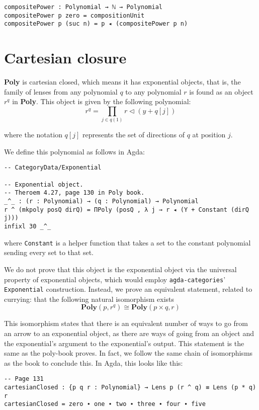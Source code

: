 \begin{verbatim}
compositePower : Polynomial → ℕ → Polynomial
compositePower p zero = compositionUnit
compositePower p (suc n) = p ◂ (compositePower p n) 
\end{verbatim}

\section{Cartesian closure}
\label{sec:cartesian}
\textbf{Poly} is cartesian closed, which means it has exponential objects, that is, the family of lenses from any polynomial $q$ to any polynomial $r$ is found as an object $r^q$ in \textbf{Poly}. This object is given by the following polynomial:
$$
\begin{equation}\label{eqn.exponential}
  r^q = \prod_{j\in q(1)}r\triangleleft(y+q[j])
\end{equation}
$$

where the notation $q[j]$ represents the set of directions of $q$ at position $j$.

We define this polynomial as follows in Agda:
\begin{verbatim}
-- CategoryData/Exponential

-- Exponential object.
-- Theroem 4.27, page 130 in Poly book.
_^_ : (r : Polynomial) → (q : Polynomial) → Polynomial
r ^ (mkpoly posQ dirQ) = ΠPoly (posQ , λ j → r ◂ (Y + Constant (dirQ j)))
infixl 30 _^_
\end{verbatim}
where \texttt{Constant} is a helper function that takes a set to the constant polynomial sending every set to that set.

We do not prove that this object is the exponential object via the universal property of exponential objects, which would employ \texttt{agda-categories}' \texttt{Exponential} construction. Instead, we prove an equivalent statement, related to currying: that the following natural isomorphism exists 
$$
\textbf{Poly}(p, r^q) \cong \textbf{Poly}(p \times q, r)
$$

This isomorphism states that there is an equivalent number of ways to go from an arrow to an exponential object, as there are ways of going from an object and the exponential's argument to the exponential's output. This statement is the same as the poly-book proves. In fact, we follow the same chain of isomorphisms as the book to conclude this. In Agda, this looks like this:
\begin{verbatim}
-- Page 131
cartesianClosed : {p q r : Polynomial} → Lens p (r ^ q) ≡ Lens (p * q) r
cartesianClosed = zero ∙ one ∙ two ∙ three ∙ four ∙ five
\end{verbatim}


